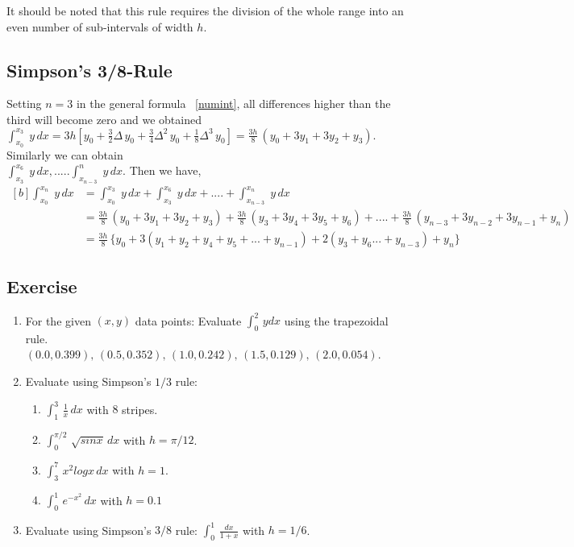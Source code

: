 \documentclass[aima203_lecturenotes_ku.tex]{subfiles}
\begin{document}
\begin{remark}
  It should be noted that this rule requires the division of the whole range into an even number of sub-intervals of width $h$.
\end{remark}

\subsection{Simpson's 3/8-Rule}
Setting $n=3$ in the general formula ~\ref{numint}, all differences higher than the third will become zero and we obtained \\[1mm]
$\displaystyle \int_{x_0}^{x_3} \; y\,dx = 3h \left [ y_0 + \frac{3}{2} \Delta \, y_0 + \frac{3}{4} \Delta^2 \, y_0 + \frac{1}{8} \Delta ^3 \, y_0 \right ] = \frac{3h}{8}\, (y_0 + 3y_1 + 3y_2+y_3).$ \\ Similarly we can obtain \\[5mm] $\int_{x_3}^{x_6} \; y\,dx, ..... \int_{x_{n-3}}^n \; y\,dx $. Then we have,
\begin{equation}
  \label{simp2}
  \begin{aligned}[b]
    \int_{x_0}^{x_n}\; y\,dx &= \int_{x_0}^{x_3} \; y\,dx + \int_{x_3}^{x_6} \; y\,dx + .... + \int_{x_{n-3}}^{x_n} \; y\,dx \\[1mm]
                             &= \frac{3h}{8} \, (y_0 +3y_1 + 3y_2 + y_3) + \frac{3h}{8} \, (y_3 + 3y_4 + 3y_5 + y_6) + .... + \frac{3h}{8} \, (y_{n-3} + 3y_{n-2} + 3y_{n-1} + y_n) \\[1mm]
                             &= \frac{3h}{8} \, \{ y_0 + 3(y_1 + y_2 + y_4 + y_5 + ... + y_{n-1}) + 2 (y_3 + y_6  ... + y_{n-3} ) + y_n \}
  \end{aligned}
\end{equation}

\subsection{Exercise}
\begin{enumerate}
\item For the given $(x,y)$ data points: Evaluate $\int_0^2 \, ydx$ using the trapezoidal rule.\\  $(0.0,0.399),\, (0.5,0.352),\,(1.0,0.242),\, (1.5,0.129),\,(2.0,0.054)$.

\item Evaluate using Simpson's $1/3$ rule:
  \begin{enumerate}
  \item $\displaystyle \int_1^3 \, \frac{1}{x}\,dx$  with $8$ stripes.
  \item $\displaystyle \int_0^{\pi /2} \, \sqrt{sinx}\, dx$ with $h= \pi /12$.

  \item $\displaystyle \int_3^7 \, x^2logx\, dx $ with $h= 1$.
    \item $\displaystyle \int_0^1 \, e^{-x^2} \, dx$ with $h=0.1$
  \end{enumerate}

\item Evaluate using Simpson's $3/8$ rule: $\displaystyle \int_0^1 \, \frac{dx}{1+x}$ with $h=1/6$.
\end{enumerate}
\end{document}
